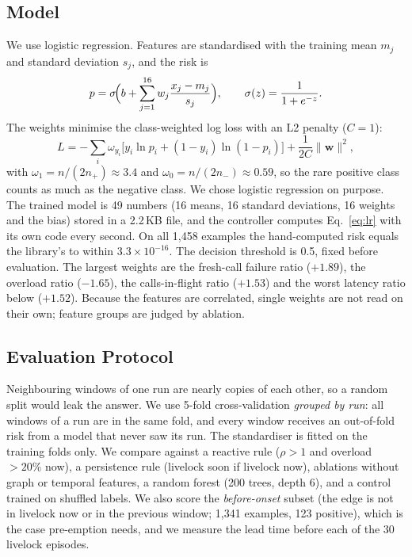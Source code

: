 \documentclass[conference,a4paper]{IEEEtran}
\begin{document}
\subsection{Model}
We use logistic regression. Features are standardised with the training mean $m_j$ and standard deviation $s_j$, and the risk is
\begin{equation}
p = \sigma\!\Bigl(b + \sum_{j=1}^{16} w_j \frac{x_j - m_j}{s_j}\Bigr), \qquad \sigma(z) = \frac{1}{1+e^{-z}} .
\label{eq:lr}
\end{equation}
The weights minimise the class-weighted log loss with an L2 penalty ($C=1$):
\begin{equation}
L = -\sum_i \omega_{y_i}\bigl[y_i \ln p_i + (1-y_i)\ln(1-p_i)\bigr] + \frac{1}{2C}\lVert \mathbf{w} \rVert^2,
\end{equation}
with $\omega_1 = n/(2n_+) \approx 3.4$ and $\omega_0 = n/(2n_-) \approx 0.59$, so the rare positive class counts as much as the negative class. We chose logistic regression on purpose. The trained model is 49 numbers (16 means, 16 standard deviations, 16 weights and the bias) stored in a 2.2\,KB file, and the controller computes Eq.~\ref{eq:lr} with its own code every second. On all 1,458 examples the hand-computed risk equals the library's to within $3.3\times10^{-16}$. The decision threshold is 0.5, fixed before evaluation. The largest weights are the fresh-call failure ratio ($+1.89$), the overload ratio ($-1.65$), the calls-in-flight ratio ($+1.53$) and the worst latency ratio below ($+1.52$). Because the features are correlated, single weights are not read on their own; feature groups are judged by ablation.

\subsection{Evaluation Protocol}
Neighbouring windows of one run are nearly copies of each other, so a random split would leak the answer. We use 5-fold cross-validation \emph{grouped by run}: all windows of a run are in the same fold, and every window receives an out-of-fold risk from a model that never saw its run. The standardiser is fitted on the training folds only. We compare against a reactive rule ($\rho > 1$ and overload $> 20\%$ now), a persistence rule (livelock soon if livelock now), ablations without graph or temporal features, a random forest (200 trees, depth 6), and a control trained on shuffled labels. We also score the \emph{before-onset} subset (the edge is not in livelock now or in the previous window; 1,341 examples, 123 positive), which is the case pre-emption needs, and we measure the lead time before each of the 30 livelock episodes.
\end{document}
